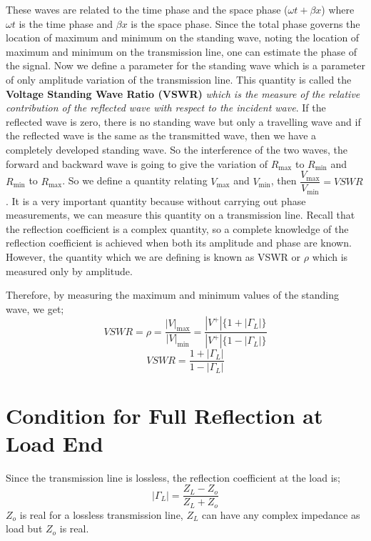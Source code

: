 These waves are related to the time phase and the space phase ($\omega t + \beta x$) where $\omega t$ is the time phase and $\beta x$ is the space phase. Since the total phase governs the location of maximum and minimum on the standing wave, noting the location of maximum and minimum on the transmission line, one can estimate the phase of the signal. Now we define a parameter for the standing wave which is a parameter of only amplitude variation of the transmission line. This quantity is called the \textbf{Voltage Standing Wave Ratio (VSWR)} \emph{which is the measure of the relative contribution of the reflected wave with respect to the incident wave}. If the reflected wave is zero, there is no standing wave but only a travelling wave and if the reflected wave is the same as the transmitted wave, then we have a completely developed standing wave. So the interference of the two waves, the forward and backward wave is going to give the variation of $R_{\max}$ to $R_{\min}$ and $R_{\min}$ to $R_{\max}$. So we define a quantity relating $V_{\max}$ and $V_{\min}$, then $\dfrac{V_{\max}}{V_{\min}}= VSWR$. It is a very important quantity because without carrying out phase measurements, we can measure this quantity on a transmission line. Recall that the reflection coefficient is a complex quantity, so a complete knowledge of the reflection coefficient is achieved when both its amplitude and phase are known. However, the quantity which we are defining is known as VSWR or \(\rho\) which is measured only by amplitude.

 Therefore, by measuring the maximum and minimum values of the standing wave, we get;
\begin{dmath*}
VSWR = \rho =\frac{|V|_{\max}}{|V|_{\min}} = \frac{|V^+|\{1+|\Gamma_L|\}}{|V^+|\{1-|\Gamma_L|\}}
\end{dmath*}
\begin{equation}
VSWR  = \frac{1+|\Gamma_L|}{1-|\Gamma_L|}	
\end{equation}

\section{Condition for Full Reflection at Load End}
Since the transmission line is lossless, the reflection coefficient at the load is;
\begin{equation*}
|\Gamma_L| = \frac{Z_L-Z_o}{Z_L+Z_o}
\end{equation*}
$Z_o$ is real for a lossless transmission line, $Z_L$ can have any complex impedance as load but $Z_o$ is real.

